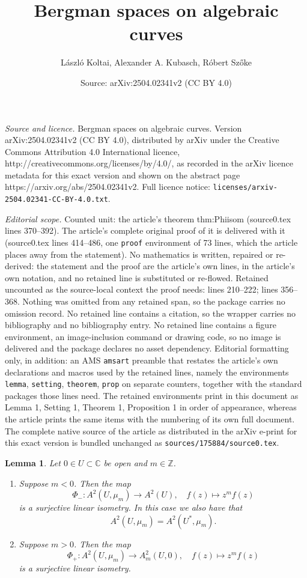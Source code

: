 \documentclass[10pt,a4paper]{amsart}
\title{Bergman spaces on algebraic curves}
\author{L\'aszl\'o Koltai, Alexander A. Kubasch, R\'obert Sz\H{o}ke}
\date{Source: arXiv:2504.02341v2 (CC BY 4.0)}
\newtheorem{lemma}{Lemma}
\newcommand{\bC}{{\mathbb C}}
\begin{document}
\maketitle

\noindent\emph{Source and licence.} Bergman spaces on algebraic curves. Version arXiv:2504.02341v2 (CC BY 4.0), distributed by arXiv under the Creative Commons Attribution 4.0 International licence, http://creativecommons.org/licenses/by/4.0/, as recorded in the arXiv licence metadata for this exact version and shown on the abstract page https://arxiv.org/abs/2504.02341v2. Full licence notice: \texttt{licenses/arxiv-2504.02341-CC-BY-4.0.txt}.\par\smallskip

\noindent\textit{Editorial scope.} Counted unit: the article's theorem thm:Phiisom (source0.tex lines 370--392). The article's complete original proof of it is delivered with it (source0.tex lines 414--486, one \texttt{proof} environment of 73 lines, which the article places away from the statement). No mathematics is written, repaired or re-derived: the statement and the proof are the article's own lines, in the article's own notation, and no retained line is substituted or re-flowed.  Retained uncounted as the source-local context the proof needs: lines 210--222; lines 356--368.  Nothing was omitted from any retained span, so the package carries no omission record.  No retained line contains a citation, so the wrapper carries no bibliography and no bibliography entry.  No retained line contains a figure environment, an image-inclusion command or drawing code, so no image is delivered and the package declares no asset dependency.  Editorial formatting only, in addition: an AMS \texttt{amsart} preamble that restates the article's own declarations and macros used by the retained lines, namely the environments \texttt{lemma}, \texttt{setting}, \texttt{theorem}, \texttt{prop} on separate counters, together with the standard packages those lines need.  The retained environments print in this document as Lemma 1, Setting 1, Theorem 1, Proposition 1 in order of appearance, whereas the article prints the same items with the numbering of its own full document.  The complete native source of the article as distributed in the arXiv e-print for this exact version is bundled unchanged as \texttt{sources/175884/source0.tex}.
\begin{lemma}\label{lem:korlap}
     Let $0 \in U\subset\bC$ be open and  $m\in \mathbb{Z}$.
     \begin{enumerate}
        \item Suppose $m < 0$. Then the map
         $$\Phi_- : A^2(U,\mu_m) \to A^2(U), \quad f(z) \mapsto z^mf(z)$$
         is a surjective linear isometry. In this case we also have that
            $$ A^2(U,\mu_m)=A^2(U^*,\mu_m).$$
         \item Suppose $m > 0$. Then the map
         $$\Phi_+ : A^2(U,\mu_m) \to A^2_m(U,0), \quad f(z) \mapsto z^mf(z)$$
         is a surjective linear isometry.
     \end{enumerate}
     
\end{lemma}
\end{document}
